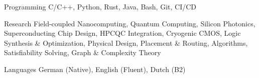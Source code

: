 

\begin{cvskills}

  \cvskill
    {Programming} %
    {C/C++, Python, Rust, Java, Bash, Git, CI/CD} %

  \cvskill
    {Research} %
    {Field-coupled Nanocomputing, Quantum Computing, Silicon Photonics, Superconducting Chip Design, HPCQC Integration, Cryogenic CMOS, Logic Synthesis \& Optimization, Physical Design, Placement \& Routing, Algorithms, Satisfiability Solving, Graph \& Complexity Theory} %

  \cvskill
    {Languages} %
    {German (Native), English (Fluent), Dutch (B2)} %

\end{cvskills}

